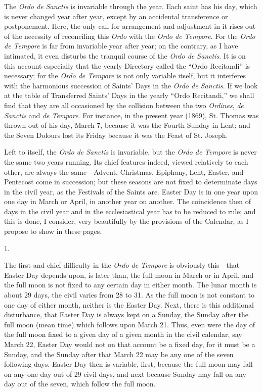The \emph{Ordo de Sanctis} is
invariable through the year. Each saint has his day, which is never
changed year after year, except by an accidental transference or
postponement. Here, the only call for arrangement and adjustment in it
rises out of the necessity of reconciling this \emph{Ordo} with the \emph{Ordo
de Tempore}. For the \emph{Ordo de Tempore} is far from invariable
year after year; on the contrary, as I have intimated, it even
disturbs the tranquil course of the \emph{Ordo de Sanctis}. It is on
this account especially that the yearly Directory called the ``Ordo
Recitandi'' is necessary; for the \emph{Ordo de Tempore} is not
only variable itself, but it interferes with the harmonious succession
of Saints' Days in the \emph{Ordo de Sanctis}. If we look at the
table of Transferred Saints' Days in the yearly ``Ordo Recitandi,''
we shall find that they are all occasioned by the collision between
the two \emph{Ordines}, \emph{de Sanctis} and \emph{de Tempore}. For
instance, in the present year (1869), St. Thomas was thrown out of his
day, March 7, because it was the Fourth Sunday in Lent; and the Seven
Dolours lost its Friday because it was the Feast of St. Joseph.

Left to itself, the \emph{Ordo de
Sanctis} is invariable, but the \emph{Ordo de Tempore} is never the
same two years running. Its chief features indeed, viewed relatively
to each other, are always the same—Advent, Christmas, Epiphany,
Lent, Easter, and Pentecost come in succession; but these seasons are
not fixed to determinate days in the civil year, as the Festivals of
the Saints are. Easter Day is in one year upon one day in March or
April, in another year on another. The coincidence then of days in the
civil year and in the ecclesiastical year has to be reduced to rule;
and this is done, I consider, very beautifully by the provisions of
the Calendar, as I propose to show in these pages.

1.

The first and chief difficulty
in the \emph{Ordo de Tempore} is obviously this—that Easter Day
depends upon, is later than, the full moon in March or in April, and
the full moon is not fixed to any certain day in either month. The
lunar month is about 29 days, the civil varies from 28 to 31. As
the full moon is not constant to one day of either month, neither is
the Easter Day. Next, there is this additional disturbance, that
Easter Day is always kept on a Sunday, the Sunday after the full moon
(mean time) which follows upon March 21. Thus, even were the day of
the full moon fixed to a given day of a given month in the civil
calendar, say March 22, Easter Day would not on that account be a
fixed day, for it must be a Sunday, and the Sunday after that March 22
may be any one of the seven following days. Easter Day then is
variable, first, because the full moon may fall on any one day out of
29 civil days, and next because Sunday may fall on any day out of the
seven, which follow the full moon.

